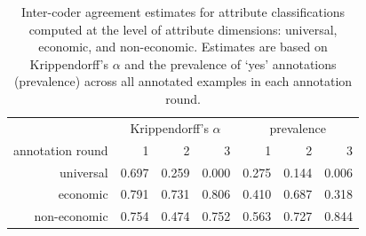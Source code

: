 \begin{table}[!th]
\centering
\caption{Inter-coder agreement estimates for attribute classifications computed at the level of attribute dimensions: universal, economic, and non-economic. Estimates are based on Krippendorff's $\alpha$ and the prevalence of `yes' annotations (prevalence) across all annotated examples in each annotation round.}
\begin{tabular}{rrrrrrr}
\toprule
 & \multicolumn{3}{c}{Krippendorff's $\alpha$} & \multicolumn{3}{c}{prevalence} \\
annotation round & 1 & 2 & 3 & 1 & 2 & 3 \\
\midrule
universal & 0.697 & 0.259 & 0.000 & 0.275 & 0.144 & 0.006 \\
economic & 0.791 & 0.731 & 0.806 & 0.410 & 0.687 & 0.318 \\
non-economic & 0.754 & 0.474 & 0.752 & 0.563 & 0.727 & 0.844 \\
\bottomrule
\end{tabular}
\end{table}
